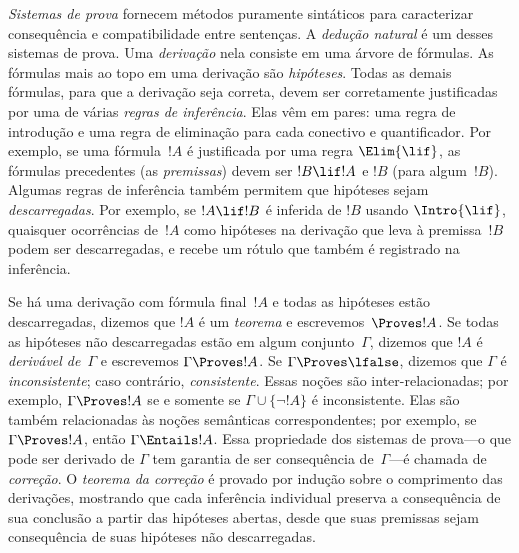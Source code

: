 \emph{Sistemas de prova} fornecem métodos puramente sintáticos para
caracterizar consequência e compatibilidade entre
sentenças. A \emph{dedução natural} é um desses sistemas de
prova. Uma \emph{derivação} nela consiste em uma árvore de fórmulas. As
fórmulas mais ao topo em uma derivação são \emph{hipóteses}. Todas as demais
fórmulas, para que a derivação seja correta, devem ser corretamente
justificadas por uma de várias \emph{regras de inferência}. Elas vêm em
pares: uma regra de introdução e uma regra de eliminação para cada conectivo e
quantificador. Por exemplo, se uma fórmula~$!A$ é justificada por uma
regra $\Elim{\lif}$, as fórmulas precedentes (as \emph{premissas}) devem
ser $!B \lif !A$ e $!B$ (para algum~$!B$). Algumas regras de inferência também
permitem que hipóteses sejam \emph{descarregadas}. Por exemplo, se $!A \lif
!B$ é inferida de $!B$ usando $\Intro{\lif}$, quaisquer ocorrências
de~$!A$ como hipóteses na derivação que leva à premissa~$!B$
podem ser descarregadas, e recebe um rótulo que também é registrado na
inferência.

Se há uma derivação com fórmula final~$!A$ e todas as hipóteses estão
descarregadas, dizemos que $!A$ é um \emph{teorema} e escrevemos~$\Proves !A$. Se
todas as hipóteses não descarregadas estão em algum conjunto~$\Gamma$, dizemos
que $!A$ é \emph{derivável de}~$\Gamma$ e escrevemos $\Gamma \Proves !A$. Se
$\Gamma \Proves \lfalse$, dizemos que $\Gamma$ é \emph{inconsistente}; caso
contrário, \emph{consistente}. Essas noções são inter-relacionadas; por
exemplo, $\Gamma \Proves !A$ se e somente se $\Gamma \cup \{\lnot !A\}$ é
inconsistente. Elas são também relacionadas às noções semânticas
correspondentes; por exemplo, se $\Gamma \Proves !A$, então $\Gamma \Entails
!A$. Essa propriedade dos sistemas de prova---o que pode ser derivado de
$\Gamma$ tem garantia de ser consequência de~$\Gamma$---é chamada de
\emph{correção}. O \emph{teorema da correção} é provado por indução sobre o
comprimento das derivações, mostrando que cada inferência individual preserva a
consequência de sua conclusão a partir das hipóteses abertas, desde que suas
premissas sejam consequência de suas hipóteses não descarregadas.
